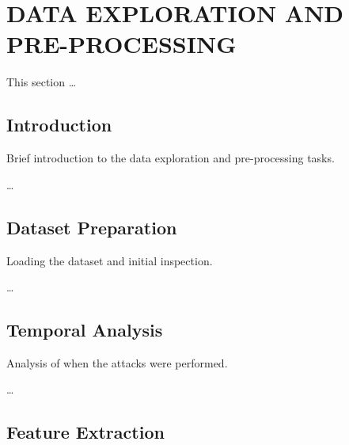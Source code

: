 

\section{DATA EXPLORATION AND PRE-PROCESSING}

    This section \ldots

    \subsection{Introduction}

        Brief introduction to the data exploration and pre-processing tasks.

        \ldots

    \subsection{Dataset Preparation}
    
        Loading the dataset and initial inspection.

        \ldots

    \subsection{Temporal Analysis}
    
        Analysis of when the attacks were performed.

        \ldots

    \subsection{Feature Extraction}
    
